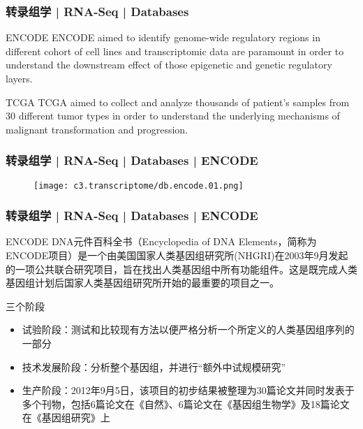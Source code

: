 \begin{frame}
  \frametitle{转录组学 | RNA-Seq | Databases}
  \begin{block}{ENCODE}
    ENCODE aimed to identify genome-wide regulatory regions in different cohort of cell lines and transcriptomic data are paramount in order to understand the downstream effect of those epigenetic and genetic regulatory layers.
  \end{block}
  \pause
  \begin{block}{TCGA}
    TCGA aimed to collect and analyze thousands of patient's samples from 30 different tumor types in order to understand the underlying mechanisms of malignant transformation and progression.
  \end{block}
\end{frame}

\begin{frame}
  \frametitle{转录组学 | RNA-Seq | Databases | ENCODE}
  \begin{figure}
    \centering
    \texttt{[image: c3.transcriptome/db.encode.01.png]}
  \end{figure}
\end{frame}

\begin{frame}
  \frametitle{转录组学 | RNA-Seq | Databases | ENCODE}
  \begin{block}{ENCODE}
 DNA元件百科全书（Encyclopedia of DNA Elements，简称为ENCODE项目）是一个由美国国家人类基因组研究所(NHGRI)在2003年9月发起的一项公共联合研究项目，旨在找出人类基因组中所有功能组件。这是既完成人类基因组计划后国家人类基因组研究所开始的最重要的项目之一。
  \end{block}
  \pause
  \begin{block}{三个阶段}
    \begin{itemize}
      \item 试验阶段：测试和比较现有方法以便严格分析一个所定义的人类基因组序列的一部分
      \item 技术发展阶段：分析整个基因组，并进行“额外中试规模研究”
      \item 生产阶段：2012年9月5日，该项目的初步结果被整理为30篇论文并同时发表于多个刊物，包括6篇论文在《自然》、6篇论文在《基因组生物学》及18篇论文在《基因组研究》上
    \end{itemize}
  \end{block}
\end{frame}

